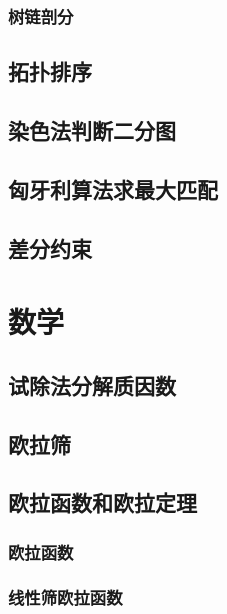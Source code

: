 \documentclass[10pt,a4paper]{article}
\begin{document}
\subsubsection{树链剖分}

\subsection{拓扑排序}

\subsection{染色法判断二分图}

\subsection{匈牙利算法求最大匹配}

\subsection{差分约束}
\begin{spacing}{1.5}

\end{spacing}

\section{数学}
\subsection{试除法分解质因数}

\subsection{欧拉筛}

\subsection{欧拉函数和欧拉定理}
\subsubsection{欧拉函数}
\begin{spacing}{1.5}

\end{spacing}

\subsubsection{线性筛欧拉函数}

\end{document}
